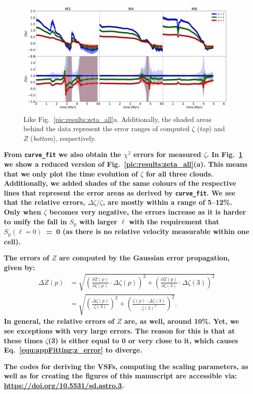 \begin{figure}
    \centering
    \includegraphics[width=\textwidth]{error_vsf04_zeta_z.pdf}
    \caption{
        Like Fig.~\ref{pic:results:zeta_all}a.
        Additionally, the shaded areas behind the data represent the error ranges of computed $\zeta$ (\textit{top}) and $Z$ (\textit{bottom}), respectively. 
    }
    \label{pic:appFitting:error_vsfhr04_zeta_z}
\end{figure}


\textbf{
    From \texttt{curve\_fit} we also obtain the $\chi^2$ errors for measured $\zeta$. 
    In Fig.~\ref{pic:appFitting:error_vsfhr04_zeta_z} we show a reduced version of Fig.~\ref{pic:results:zeta_all}(a).
    This means that we only plot the time evolution of $\zeta$ for all three clouds.
    Additionally, we added shades of the same colours of the respective lines that represent the error areas as derived by \texttt{curve\_fit}.
    We see that the relative errors, $\Delta \zeta / \zeta$, are mostly within a range of 5--12\%. 
    Only when $\zeta$ becomes very negative, the errors increase as it is harder to unify the fall in $S_\mathrm{p}$ with larger $\ell$ with the requirement that $S_\mathrm{p} (\ell=0)$~=~0 (as there is no relative velocity measurable within one cell).
}

\textbf{
    The errors of $Z$ are computed by the Gaussian error propagation, given by:
}
\begin{align}\Delta Z(p) &= \sqrt{ \left( \frac{\partial Z(p)}{\partial \zeta(p)} \cdot \Delta\zeta(p) \right)^2 + \left( \frac{\partial Z(p)}{\partial \zeta(3)} \cdot \Delta\zeta(3) \right)^2 } \\
        &= \sqrt{ \left( \frac{\Delta\zeta(p)}{\zeta(3)} \right)^2 + \left( \frac{ \zeta(p) \cdot \Delta\zeta(3)}{\zeta(3)^2} \right)^2 }.
        \label{equ:appFitting:z_error}
\end{align}
\textbf{
    \noindent In general, the relative errors of $Z$ are, as well, around 10\%.
    Yet, we see exceptions with very large errors. 
    The reason for this is that at these times $\zeta$(3) is either equal to 0 or very close to it, which causes Eq.~\ref{equ:appFitting:z_error} to diverge.
}

\textbf{
    The codes for deriving the VSFs, computing the scaling parameters, as well as for creating the figures of this manuscript are accessible via: \newline
    {\url{https://doi.org/10.5531/sd.astro.3}}.
}


\endinput
